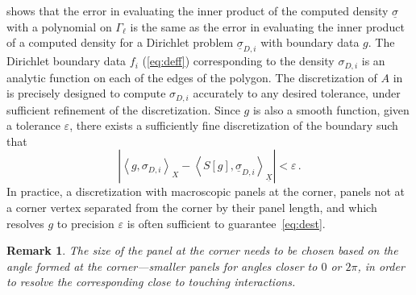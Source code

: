 \documentclass[12pt,times]{elsarticle}
\newtheorem{remark}[definition]{Remark}
\newcommand{\usigma}{\underline{\sigma}}
\newcommand{\uX}{\underline{X}}
\begin{document}
{ shows that the error in evaluating the inner product of the computed density $\usigma$ with a polynomial on
$\Gamma_{\ell}$ is the same as the error in evaluating the inner product of a computed density for a Dirichlet problem $\usigma_{D,i}$ with boundary data $g$. 
The Dirichlet boundary data $f_{i}$ (\cref{eq:deff}) corresponding to the density $\sigma_{D,i}$ is an analytic function on each of the edges of the polygon. 
The discretization of $A$ in~\cite{hoskins2019numerical} is precisely designed to compute $\sigma_{D,i}$ accurately to any desired tolerance, under sufficient refinement of the discretization. Since $g$ is also a smooth function, given a tolerance $\varepsilon$, there exists a sufficiently fine discretization of the boundary such that
\begin{equation}
\left| \left< g, \sigma_{D,i} \right>_{X} - \left< S[g], \usigma_{D,i} \right>_{\uX} \right| < \varepsilon \, . \label{eq:dest}
\end{equation}
In practice, a discretization with macroscopic panels at the corner, panels not at a corner vertex separated from the corner by their panel length, and which resolves $g$ to precision $\varepsilon$ is often sufficient to guarantee~\cref{eq:dest}. 
\begin{remark}
The size of the panel at the corner needs to be chosen based on the angle formed at the corner---smaller panels for angles closer to $0$ or $2\pi$, in order to resolve the corresponding close to touching interactions.
\end{remark}
} 
 
 
 
\end{document}
